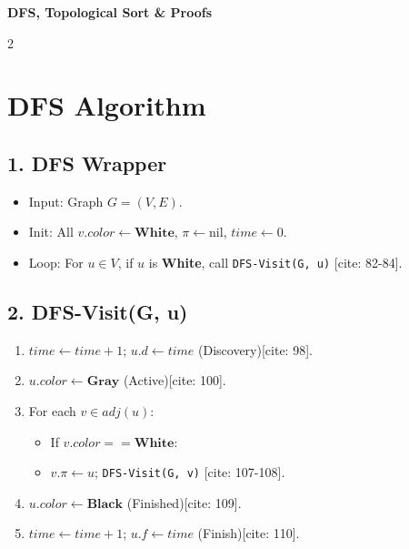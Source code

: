 \documentclass[a4paper,10pt]{article}
\begin{document}
\begin{center}
    {\Huge \textbf{DFS, Topological Sort \& Proofs}}
\end{center}

\begin{multicols*}{2}

\section{DFS Algorithm}
\subsection*{1. DFS Wrapper}
\begin{itemize}[leftmargin=*]
    \item Input: Graph $G=(V, E)$.
    \item Init: All $v.color \leftarrow \textbf{White}$, $\pi \leftarrow \text{nil}$, $time \leftarrow 0$.
    \item Loop: For $u \in V$, if $u$ is \textbf{White}, call \texttt{DFS-Visit(G, u)} [cite: 82-84].
\end{itemize}

\subsection*{2. DFS-Visit(G, u)}
\begin{enumerate}[leftmargin=*, label=\arabic*.]
    \item $time \leftarrow time + 1$; $u.d \leftarrow time$ (Discovery)[cite: 98].
    \item $u.color \leftarrow \textbf{Gray}$ (Active)[cite: 100].
    \item For each $v \in adj(u)$:
    \begin{itemize}
        \item If $v.color == \textbf{White}$:
        \item $v.\pi \leftarrow u$; \texttt{DFS-Visit(G, v)} [cite: 107-108].
    \end{itemize}
    \item $u.color \leftarrow \textbf{Black}$ (Finished)[cite: 109].
    \item $time \leftarrow time + 1$; $u.f \leftarrow time$ (Finish)[cite: 110].
\end{enumerate}


\end{multicols*}
\end{document}
